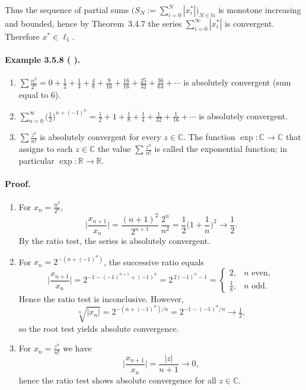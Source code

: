\documentclass[12pt,a4paper]{article}
\newcommand{\N}{\mathbb{N}}
\newcommand{\R}{\mathbb{R}}
\newcommand{\C}{\mathbb{C}}
\newcommand{\NumberedExample}[3]{%
\paragraph*{Example #1 ( #2 ).} #3\par}
\theoremstyle{plain}
\theoremstyle{definition}
\theoremstyle{remark}
\begin{document}
Thus the sequence of partial sums $\big(S_N:=\sum_{i=0}^{N} |x_i^{\ast}|\big)_{N\in\N}$ is monotone increasing and bounded, hence by Theorem~3.4.7 the series $\sum_{i=0}^{\infty} |x_i^{\ast}|$ is convergent. Therefore $x^{\ast}\in\ell_{1}$.


\NumberedExample{3.5.8}{}{\begin{enumerate}[label={(\arabic*)}, leftmargin=*]
	\item $\displaystyle \sum \frac{n^2}{2^n} = 0 + \frac12 + \frac14 + \frac{4}{8} + \frac{9}{16} + \frac{16}{16} + \frac{25}{32} + \frac{36}{64} + \cdots$ is absolutely convergent (sum equal to $6$).
	\item $\displaystyle \sum_{n=0}^{\infty} \Big(\tfrac12\Big)^{n+(-1)^n} = \tfrac12 + 1 + \tfrac18 + \tfrac14 + \tfrac{1}{32} + \tfrac{1}{16} + \cdots$ is absolutely convergent.
	\item $\displaystyle \sum \frac{z^n}{n!}$ is absolutely convergent for every $z\in\C$. The function $\exp:\C\to\C$ that assigns to each $z\in\C$ the value $\sum \tfrac{z^n}{n!}$ is called the exponential function; in particular $\exp: \R\to\R$.
\end{enumerate}}

\paragraph{Proof.}
\begin{enumerate}[label={(\arabic*)}, leftmargin=*]
	\item For $x_n=\tfrac{n^2}{2^n}$,
	\[
		\Bigg|\frac{x_{n+1}}{x_n}\Bigg| = \frac{(n+1)^2}{2^{n+1}}\,\frac{2^n}{n^2} = \frac12\Big(1+\frac{1}{n}\Big)^2 \longrightarrow \frac12.
	\]
	By the ratio test, the series is absolutely convergent.
	\item For $x_n = 2^{-(n+(-1)^n)}$, the successive ratio equals
	\[
		\Bigg|\frac{x_{n+1}}{x_n}\Bigg| = 2^{-1 - (-1)^{n+1} + (-1)^n} = 2^{\,2(-1)^n-1} =
		\begin{cases}
			2, & n \text{ even},\\[2pt]
				\frac{1}{8}, & n \text{ odd}.
		\end{cases}
	\]
	Hence the ratio test is inconclusive. However,
	\[
		\sqrt[n]{|x_n|} = 2^{-(n+(-1)^n)/n} = 2^{-1 - (-1)^n/n} \longrightarrow \tfrac12,
	\]
	so the root test yields absolute convergence.
	\item For $x_n = \tfrac{z^n}{n!}$ we have
	\[
		\Bigg|\frac{x_{n+1}}{x_n}\Bigg| = \frac{|z|}{n+1} \longrightarrow 0,
	\]
	hence the ratio test shows absolute convergence for all $z\in\C$.
\end{enumerate}
\end{document}
